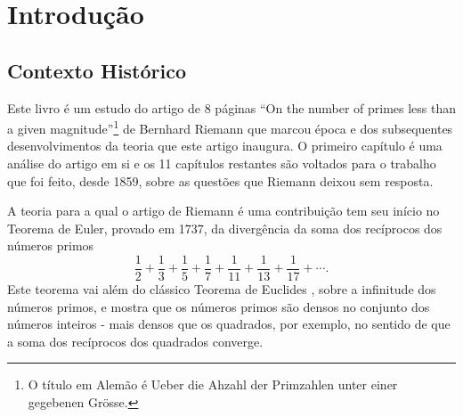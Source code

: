 \chapter[Introdução]{Introdução}
\chaptermark{}


\section{Contexto Histórico}

    Este livro é um estudo do artigo de 8 páginas ``On the number of primes less than a given magnitude''\footnote{O título em Alemão é Ueber die Ahzahl der Primzahlen unter einer gegebenen Gr\"osse.} de Bernhard Riemann que marcou época e dos subsequentes desenvolvimentos da teoria que este artigo inaugura. O primeiro capítulo é uma análise do artigo em si e os 11 capítulos restantes são voltados para o trabalho que foi feito, desde 1859, sobre as questões que Riemann deixou sem resposta.

    A teoria para a qual o artigo de Riemann é uma contribuição tem seu início no Teorema de Euler, provado em 1737, da divergência da soma dos recíprocos dos números primos
    \begin{equation}
    \label{Soma-Recip-primos}
    \frac{1}{2} + \frac{1}{3} + \frac{1}{5} + \frac{1}{7} + \frac{1}{11} + \frac{1}{13} + \frac{1}{17} + \cdots.
    \end{equation}
    Este teorema vai além do clássico 
    Teorema de Euclides \cite{MR1932864}, sobre a infinitude 
    dos números primos, e mostra que os números primos 
    são densos no conjunto dos números inteiros - 
    mais densos que os quadrados, por exemplo, 
    no sentido de que a soma dos recíprocos dos quadrados converge.
    
